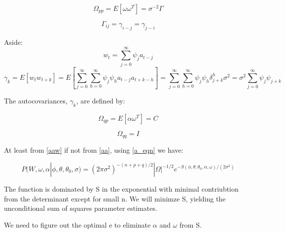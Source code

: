 \documentclass[8pt]{article}
\begin{document}
\begin{equation}
\Omega_{pp} = E[\omega \omega^T] = \sigma^{-2} \Gamma
\end{equation}

\begin{equation}
\Gamma_{ij} = \gamma_{i-j} = \gamma_{j-i}
\end{equation}

Aside:
\begin{equation}
w_t = \sum_{j=0}^{\infty} \psi_j a_{t-j}
\end{equation}
\begin{equation}
\gamma_k = E[w_t w_{t+k}] = E[\sum_{j=0}^{\infty} \sum_{h=0}^{\infty} \psi_j \psi_{h} a_{t-j} a_{t+k-h}] = \sum_{j=0}^{\infty} \sum_{h=0}^{\infty} \psi_j \psi_{h} \delta^h_{j+k} \sigma^{2} = \sigma^2 \sum_{j=0}^{\infty} \psi_j \psi_{j+k}
\end{equation}

The autocovariances, $\gamma_k$, are defined by:




\begin{equation}
\Omega_{qp} = E[\alpha \omega^T] = C
\end{equation}

\begin{equation}
\Omega_{qq} = I
\end{equation}

At least from \ref{aaw} if not from \ref{aa}, using \ref{a_eqn} we have:


\begin{equation}
P(W,\omega,\alpha|\phi,\theta,\theta_0,\sigma) = (2\pi \sigma^2)^{-(n+p+q)/2} |\Omega|^{-1/2} e^{-S(\phi,\theta,\theta_0,\alpha,\omega)/(2\sigma^2)}
\end{equation}


The function is dominated by S in the exponential with minimal contriubtion from the determinant except for small n. We will minimze S, yielding the unconditional sum of squares parameter estimates.

We need to figure out the optimal e to eliminate $\alpha$ and $\omega$ from S.
\end{document}
